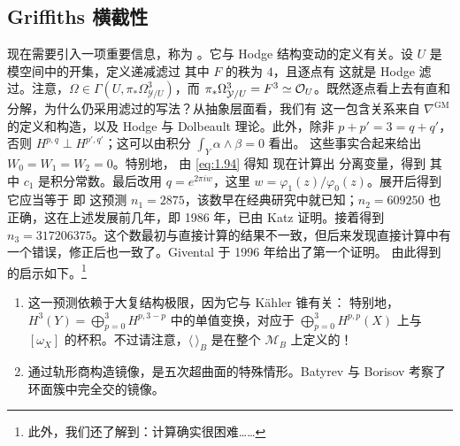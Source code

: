 \subsection{Griffiths 横截性}
现在需要引入一项重要信息，称为 。它与 Hodge 结构变动的定义有关。设 $U$ 是模空间中的开集，定义递减滤过
其中 $F$ 的秩为 $4$，且逐点有
这就是 Hodge 滤过。注意，$\Omega\in\Gamma(U,\pi_*\Omega^3_{\mathcal Y/U})$，而 $\pi_*\Omega^3_{\mathcal Y/U}=F^3\simeq\mathcal O_U$。既然逐点看上去有直和分解，为什么仍采用滤过的写法？从抽象层面看，我们有
这一包含关系来自 $\nabla^{\mathrm{GM}}$ 的定义和构造，以及 Hodge 与 Dolbeault 理论。此外，除非 $p+p'=3=q+q'$，否则 $H^{p,q}\perp H^{p',q'}$；这可以由积分 $\int_Y\alpha\wedge\beta=0$ 看出。
这些事实合起来给出 $W_0=W_1=W_2=0$。特别地，
由 \eqref{eq:1.94} 得知
现在计算出
分离变量，得到
其中 $c_1$ 是积分常数。最后改用 $q=e^{2\pi i w}$，这里 $w=\varphi_1(z)/\varphi_0(z)$。展开后得到
它应当等于
即
这预测 $n_1=2875$，该数早在经典研究中就已知；$n_2=609250$ 也正确，这在上述发展前几年，即 1986 年，已由 Katz 证明。接着得到 $n_3=317206375$。这个数最初与直接计算的结果不一致，但后来发现直接计算中有一个错误，修正后也一致了。Givental 于 1996 年给出了第一个证明。
由此得到的启示如下。\footnote{此外，我们还了解到：计算确实很困难……}
\begin{enumerate}
\item 这一预测依赖于大复结构极限，因为它与 Kähler 锥有关：
特别地，$H^3(Y)=\bigoplus_{p=0}^3H^{p,3-p}$ 中的单值变换，对应于 $\bigoplus_{p=0}^3H^{p,p}(X)$ 上与 $[\omega_X]$ 的杯积。不过请注意，$\langle\,\rangle_B$ 是在整个 $\mathcal M_B$ 上定义的！
\item 通过轨形商构造镜像，是五次超曲面的特殊情形。Batyrev 与 Borisov 考察了环面簇中完全交的镜像。
\end{enumerate}
